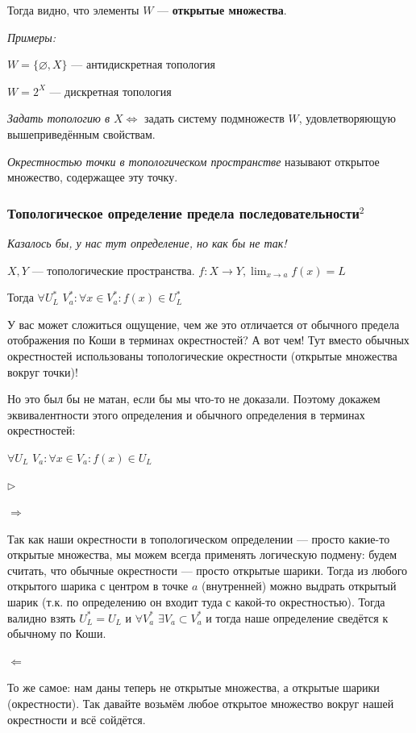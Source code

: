 \documentclass{article}
\def\dbl{\,\,}
\begin{document}
Тогда видно, что элементы $W$ --- \textbf{открытые множества}.

\textit{Примеры:}

$W = \{\varnothing, X\}$ --- антидискретная топология

$W = 2^X$ --- дискретная топология

\textit{Задать топологию в $X \Leftrightarrow$} задать систему подмножеств $W$, удовлетворяющую вышеприведённым свойствам.

\textit{Окрестностью точки в топологическом пространстве} называют открытое множество, содержащее эту точку.

\subsubsection{Топологическое определение предела последовательности\texorpdfstring{$^2$}{}}

\textit{Казалось бы, у нас тут определение, но как бы не так!} \Smiley

$X, Y$ --- топологические пространства. $f: X \rightarrow Y, \lim_{x \rightarrow a}{f(x)} = L$

Тогда $\forall U^*_L \dbl V^*_a : \forall x \in V^*_a : f(x) \in U^*_L$

У вас может сложиться ощущение, чем же это отличается от обычного предела отображения по Коши в терминах окрестностей? А вот чем! Тут вместо обычных окрестностей использованы топологические окрестности (открытые множества вокруг точки)!

Но это был бы не матан, если бы мы что-то не доказали. Поэтому докажем эквивалентности этого определения и обычного определения в терминах окрестностей: 

$\forall U_L \dbl V_a : \forall x \in V_a : f(x) \in U_L$

$\rhd$

$\Rightarrow$

Так как наши окрестности в топологическом определении --- просто какие-то открытые множества, мы можем всегда применять логическую подмену: будем считать, что обычные окрестности --- просто открытые шарики. Тогда из любого открытого шарика с центром в точке $a$ (внутренней) можно выдрать открытый шарик (т.к. по определению он входит туда с какой-то окрестностью). Тогда валидно взять $U^*_L = U_L$ и $\forall V^*_a \dbl \exists V_a \subset V^*_a$ и тогда наше определение сведётся к обычному по Коши.

$\Leftarrow$

То же самое: нам даны теперь не открытые множества, а открытые шарики (окрестности). Так давайте возьмём любое открытое множество вокруг нашей окрестности и всё сойдётся.
\end{document}
